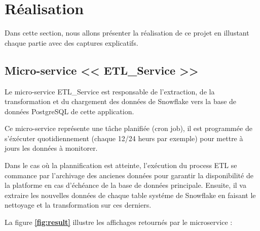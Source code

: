 \section{Réalisation}
\par Dans cette section, nous allons présenter la réalisation de ce projet en illustant chaque partie avec des captures explicatifs.
\subsection{Micro-service << ETL\_Service >>}
\par Le micro-service ETL\_Service est responsable de l'extraction, de la transformation et du chargement des données de Snowflake vers la base de données PostgreSQL de cette application.
\par Ce micro-service représente une tâche planifiée (cron job), il est programmée de s'éxécuter quotidiennement (chaque 12/24 heurs par exemple) pour mettre à jours les données à monitorer. 
\par Dans le cas où la plannification est atteinte, l'exécution du process ETL se commance par l'archivage des ancienes données pour garantir la disponibilité de la platforme en cas d'échéance de la base de données principale.  
Ensuite, il va extraire les nouvelles données de chaque table systéme de Snowflake en faisant le nettoyage et la transformation sur ces derniers. 
\par  La figure \textbf{\ref{fig:result}} illustre les affichages retournés par le microservice : 
